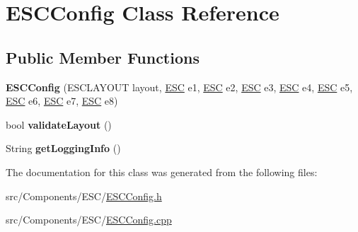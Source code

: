 \hypertarget{classESCConfig}{}\section{E\+S\+C\+Config Class Reference}
\label{classESCConfig}
\subsection*{Public Member Functions}
\begin{DoxyCompactItemize}
\item 
\hypertarget{classESCConfig_a4fa17d962c059d2ea3fc3505893acbe1}{}{\bfseries E\+S\+C\+Config} (E\+S\+C\+L\+A\+Y\+O\+U\+T layout, \hyperlink{classESC}{E\+S\+C} e1, \hyperlink{classESC}{E\+S\+C} e2, \hyperlink{classESC}{E\+S\+C} e3, \hyperlink{classESC}{E\+S\+C} e4, \hyperlink{classESC}{E\+S\+C} e5, \hyperlink{classESC}{E\+S\+C} e6, \hyperlink{classESC}{E\+S\+C} e7, \hyperlink{classESC}{E\+S\+C} e8)\label{classESCConfig_a4fa17d962c059d2ea3fc3505893acbe1}

\item 
\hypertarget{classESCConfig_a4224f98b7b7b376cbb9623443a7759a5}{}bool {\bfseries validate\+Layout} ()\label{classESCConfig_a4224f98b7b7b376cbb9623443a7759a5}

\item 
\hypertarget{classESCConfig_a79c10721918440e631cca0fc754402ad}{}String {\bfseries get\+Logging\+Info} ()\label{classESCConfig_a79c10721918440e631cca0fc754402ad}

\end{DoxyCompactItemize}


The documentation for this class was generated from the following files\+:\begin{DoxyCompactItemize}
\item 
src/\+Components/\+E\+S\+C/\hyperlink{ESCConfig_8h}{E\+S\+C\+Config.\+h}\item 
src/\+Components/\+E\+S\+C/\hyperlink{ESCConfig_8cpp}{E\+S\+C\+Config.\+cpp}\end{DoxyCompactItemize}
